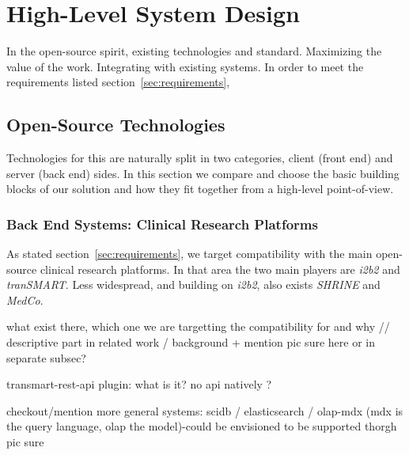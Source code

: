 \chapter{High-Level System Design}
\label{sec:sysdesign}

In the open-source spirit, existing technologies and standard. Maximizing the value of the work. 
Integrating with existing systems.
In order to meet the requirements listed section~\ref{sec:requirements}, 


\section{Open-Source Technologies}
Technologies for this are naturally split in two categories, client (front end) and server (back end) sides.
In this section we compare and choose the basic building blocks of our solution and how they fit together from a high-level point-of-view.

\subsection{Back End Systems: Clinical Research Platforms}
As stated section~\ref{sec:requirements}, we target compatibility with the main open-source clinical research platforms. 
In that area the two main players are \emph{i2b2} and \emph{tranSMART}.
Less widespread, and building on \emph{i2b2}, also exists \emph{SHRINE} and \emph{MedCo}.




what exist there, which one we are targetting the compatibility for and why // descriptive part in related work / background
+ mention pic sure here or in separate subsec?

transmart-rest-api plugin: what is it? no api natively ?

checkout/mention more general systems: scidb / elasticsearch / olap-mdx (mdx is the query language, olap the model)-could be envisioned to be supported thorgh pic sure


